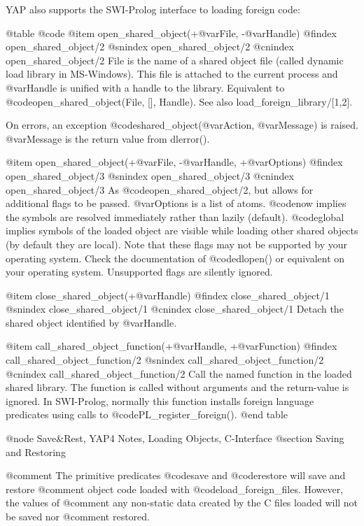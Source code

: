 {{{{{{{{{YAP also supports the SWI-Prolog interface to loading foreign code:

@table @code
@item open_shared_object(+@var{File}, -@var{Handle})
@findex open_shared_object/2
@snindex open_shared_object/2
@cnindex open_shared_object/2
    File is the name of a shared object file (called dynamic load
    library in MS-Windows). This file is attached to the current process
    and @var{Handle} is unified with a handle to the library. Equivalent to
    @code{open_shared_object(File, [], Handle)}. See also
    load_foreign_library/[1,2].

    On errors, an exception @code{shared_object}(@var{Action},
    @var{Message}) is raised. @var{Message} is the return value from
    dlerror().

@item open_shared_object(+@var{File}, -@var{Handle}, +@var{Options})
@findex open_shared_object/3
@snindex open_shared_object/3
@cnindex open_shared_object/3
    As @code{open_shared_object/2}, but allows for additional flags to
    be passed. @var{Options} is a list of atoms. @code{now} implies the
    symbols are 
    resolved immediately rather than lazily (default). @code{global} implies
    symbols of the loaded object are visible while loading other shared
    objects (by default they are local). Note that these flags may not
    be supported by your operating system. Check the documentation of
    @code{dlopen()} or equivalent on your operating system. Unsupported
    flags  are silently ignored. 

@item close_shared_object(+@var{Handle})
@findex close_shared_object/1
@snindex close_shared_object/1
@cnindex close_shared_object/1
    Detach the shared object identified by @var{Handle}. 

@item call_shared_object_function(+@var{Handle}, +@var{Function})
@findex call_shared_object_function/2
@snindex call_shared_object_function/2
@cnindex call_shared_object_function/2
    Call the named function in the loaded shared library. The function
    is called without arguments and the return-value is
    ignored. In SWI-Prolog, normally this function installs foreign
    language predicates using calls to @code{PL_register_foreign()}.
@end table

@node Save&Rest, YAP4 Notes, Loading Objects, C-Interface
@section Saving and Restoring

@comment The primitive predicates @code{save} and @code{restore} will save and restore
@comment object code loaded with @code{load_foreign_files}. However, the values of
@comment any non-static data created by the C files loaded will not be saved nor
@comment restored.

}}}}}}}}}
